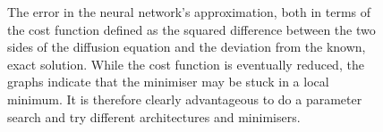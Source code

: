 \documentclass[11pt,british,a4paper]{article}
\numberwithin{equation}{section}
\begin{document}
\begin{figure}
    \centering
    \caption{The error in the neural network's approximation, both in terms of the cost function defined as the squared difference between the two sides of the diffusion equation and the deviation from the known, exact solution. While the cost function is eventually reduced, the graphs indicate that the minimiser may be stuck in a local minimum. It is therefore clearly advantageous to do a parameter search and try different architectures and minimisers.}\label{fig:nncost}
\end{figure}
\end{document}
